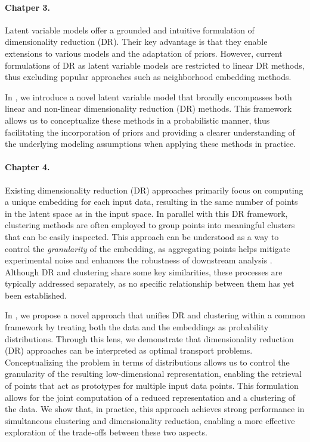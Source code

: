 \paragraph{Chatper 3.} 
Latent variable models offer a grounded and intuitive formulation of dimensionality reduction (DR). Their key advantage is that they enable extensions to various models and the adaptation of priors. However, current formulations of DR as latent variable models are restricted to linear DR methods, thus excluding popular approaches such as neighborhood embedding methods. 

In , we introduce a novel latent variable model that broadly encompasses both linear and non-linear dimensionality reduction (DR) methods. This framework allows us to conceptualize these methods in a probabilistic manner, thus facilitating the incorporation of priors and providing a clearer understanding of the underlying modeling assumptions when applying these methods in practice.

\paragraph{Chapter 4.}  
Existing dimensionality reduction (DR) approaches primarily focus on computing a unique embedding for each input data, resulting in the same number of points in the latent space as in the input space. In parallel with this DR framework, clustering methods are often employed to group points into meaningful clusters that can be easily inspected. This approach can be understood as a way to control the \emph{granularity} of the embedding, as aggregating points helps mitigate experimental noise and enhances the robustness of downstream analysis \citep{persad2023seacells}. Although DR and clustering share some key similarities, these processes are typically addressed separately, as no specific relationship between them has yet been established.

In , we propose a novel approach that unifies DR and clustering within a common framework by treating both the data and the embeddings as probability distributions. Through this lens, we demonstrate that dimensionality reduction (DR) approaches can be interpreted as optimal transport problems. Conceptualizing the problem in terms of distributions allows us to control the granularity of the resulting low-dimensional representation, enabling the retrieval of points that act as prototypes for multiple input data points. This formulation allows for the joint computation of a reduced representation and a clustering of the data. We show that, in practice, this approach achieves strong performance in simultaneous clustering and dimensionality reduction, enabling a more effective exploration of the trade-offs between these two aspects.

